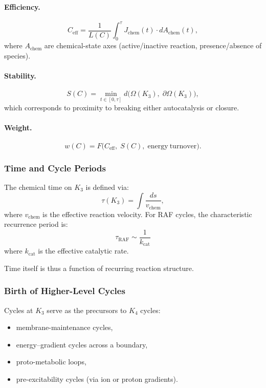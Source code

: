 \paragraph{Efficiency.}
\[
  C_{\mathrm{eff}}
   = \frac{1}{L(C)}
     \int_0^\tau J_{\mathrm{chem}}(t)\cdot dA_{\mathrm{chem}}(t),
\]
where $A_{\mathrm{chem}}$ are chemical-state axes (active/inactive
reaction, presence/absence of species).

\paragraph{Stability.}
\[
  S(C) = \min_{t\in[0,\tau]}
         d\bigl(
           \Omega(K_3),\;
           \partial\Omega(K_3)
         \bigr),
\]
which corresponds to proximity to breaking either autocatalysis or
closure.

\paragraph{Weight.}
\[
  w(C) = F\bigl(
           C_{\mathrm{eff}},\;
           S(C),\;
           \mathrm{energy\ turnover}
         \bigr).
\]

\subsubsection{Time and Cycle Periods}

The chemical time on $K_3$ is defined via:
\[
  \tau(K_3) = \int \frac{ds}{v_{\mathrm{chem}}},
\]
where $v_{\mathrm{chem}}$ is the effective reaction velocity.
For RAF cycles, the characteristic recurrence period is:
\[
  \tau_{\mathrm{RAF}}
  \sim \frac{1}{k_{\mathrm{cat}}}
\]
where $k_{\mathrm{cat}}$ is the effective catalytic rate.

Time itself is thus a function of recurring reaction structure.

\subsubsection{Birth of Higher-Level Cycles}

Cycles at $K_3$ serve as the precursors to $K_4$ cycles:

\begin{itemize}
  \item membrane-maintenance cycles,
  \item energy–gradient cycles across a boundary,
  \item proto-metabolic loops,
  \item pre-excitability cycles (via ion or proton gradients).
\end{itemize}

